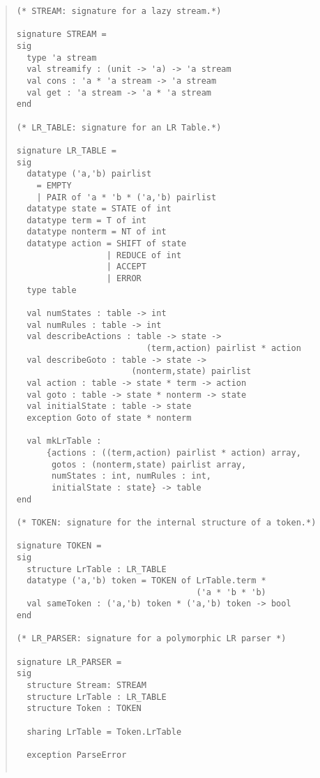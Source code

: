 \begin{quote}
\begin{verbatim}
(* STREAM: signature for a lazy stream.*)

signature STREAM =
sig
  type 'a stream
  val streamify : (unit -> 'a) -> 'a stream
  val cons : 'a * 'a stream -> 'a stream
  val get : 'a stream -> 'a * 'a stream
end

(* LR_TABLE: signature for an LR Table.*)

signature LR_TABLE =
sig
  datatype ('a,'b) pairlist
    = EMPTY
    | PAIR of 'a * 'b * ('a,'b) pairlist
  datatype state = STATE of int
  datatype term = T of int
  datatype nonterm = NT of int
  datatype action = SHIFT of state
                  | REDUCE of int
                  | ACCEPT
                  | ERROR
  type table
	
  val numStates : table -> int
  val numRules : table -> int
  val describeActions : table -> state ->
                          (term,action) pairlist * action
  val describeGoto : table -> state ->
                       (nonterm,state) pairlist
  val action : table -> state * term -> action
  val goto : table -> state * nonterm -> state
  val initialState : table -> state
  exception Goto of state * nonterm

  val mkLrTable :
      {actions : ((term,action) pairlist * action) array,
       gotos : (nonterm,state) pairlist array,
       numStates : int, numRules : int,
       initialState : state} -> table
end

(* TOKEN: signature for the internal structure of a token.*)

signature TOKEN =
sig
  structure LrTable : LR_TABLE
  datatype ('a,'b) token = TOKEN of LrTable.term *
                                    ('a * 'b * 'b)
  val sameToken : ('a,'b) token * ('a,'b) token -> bool
end

(* LR_PARSER: signature for a polymorphic LR parser *)

signature LR_PARSER =
sig
  structure Stream: STREAM
  structure LrTable : LR_TABLE
  structure Token : TOKEN

  sharing LrTable = Token.LrTable

  exception ParseError


\end{verbatim}
\end{quote}
